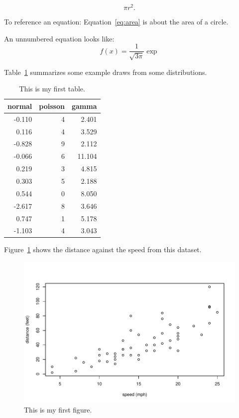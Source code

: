 \documentclass[12pt]{article}
\begin{document}
\begin{equation}
    \label{eq:area}
    \pi r^2.
\end{equation}


To reference an equation:
Equation~\eqref{eq:area} is about the area of a circle. 
    


An unnumbered equation looks like:
\[
f(x)=\frac{1}{\sqrt{3\pi}}\exp
\]

Table~\ref{tab:rv} summarizes some example draws from some distributions.


\begin{table}[ht]
  \caption{This is my first table.}
  \label{tab:rv}
\centering
\begin{tabular}{rrr}
  \hline
normal & poisson & gamma \\ 
  \hline
-0.110 & 4 & 2.401 \\ 
  0.116 & 4 & 3.529 \\ 
  -0.828 & 9 & 2.112 \\ 
  -0.066 & 6 & 11.104 \\ 
  0.219 & 3 & 4.815 \\ 
  0.303 & 5 & 2.188 \\ 
  0.544 & 0 & 8.050 \\ 
  -2.617 & 8 & 3.646 \\ 
  0.747 & 1 & 5.178 \\ 
  -1.103 & 4 & 3.043 \\ 
   \hline
\end{tabular}
\end{table}

Figure~\ref{fig:cars} shows the distance against the speed from this dataset.

\begin{figure}[H]
  \centering
  \includegraphics[width=\textwidth]{cars.pdf}
  \caption{This is my first figure.}
  \label{fig:cars}
\end{figure}
\end{document}
